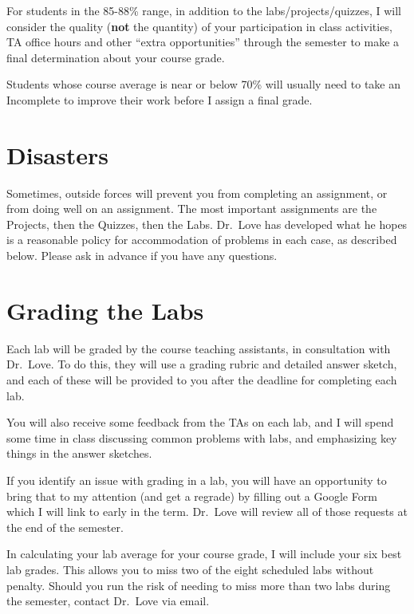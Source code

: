 \documentclass[
]{book}
\begin{document}
For students in the 85-88\% range, in addition to the labs/projects/quizzes, I will consider the quality (\textbf{not} the quantity) of your participation in class activities, TA office hours and other ``extra opportunities'' through the semester to make a final determination about your course grade.

Students whose course average is near or below 70\% will usually need to take an Incomplete to improve their work before I assign a final grade.

\hypertarget{disasters}{%
\section{Disasters}\label{disasters}}

Sometimes, outside forces will prevent you from completing an assignment, or from doing well on an assignment. The most important assignments are the Projects, then the Quizzes, then the Labs. Dr.~Love has developed what he hopes is a reasonable policy for accommodation of problems in each case, as described below. Please ask in advance if you have any questions.

\hypertarget{grading-the-labs}{%
\section{Grading the Labs}\label{grading-the-labs}}

Each lab will be graded by the course teaching assistants, in consultation with Dr.~Love. To do this, they will use a grading rubric and detailed answer sketch, and each of these will be provided to you after the deadline for completing each lab.

You will also receive some feedback from the TAs on each lab, and I will spend some time in class discussing common problems with labs, and emphasizing key things in the answer sketches.

If you identify an issue with grading in a lab, you will have an opportunity to bring that to my attention (and get a regrade) by filling out a Google Form which I will link to early in the term. Dr.~Love will review all of those requests at the end of the semester.

In calculating your lab average for your course grade, I will include your six best lab grades. This allows you to miss two of the eight scheduled labs without penalty. Should you run the risk of needing to miss more than two labs during the semester, contact Dr.~Love via email.
\end{document}
